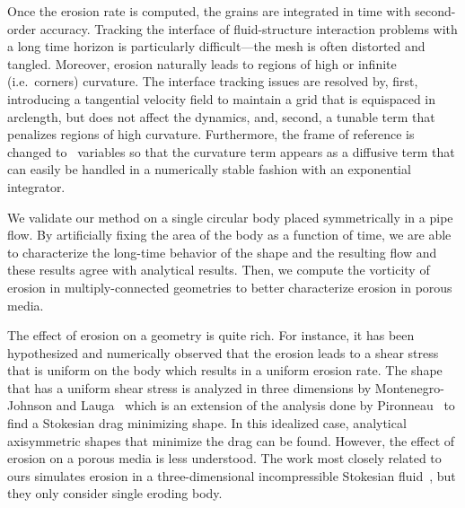 \documentclass[preprint, 10pt]{elsarticle}
\begin{document}
Once the erosion rate is computed, the grains are integrated in time with
second-order accuracy.  Tracking the interface of fluid-structure
interaction problems with a long time horizon is particularly
difficult---the mesh is often distorted and tangled.  Moreover, erosion
naturally leads to regions of high or infinite (i.e.~corners) curvature.
The interface tracking issues are resolved by, first, introducing a
tangential velocity field to maintain a grid that is equispaced in
arclength, but does not affect the dynamics, and, second, a tunable term
that penalizes regions of high curvature.  Furthermore, the frame of
reference is changed to \thL~variables so that the curvature term
appears as a diffusive term that can easily be handled in a numerically
stable fashion with an exponential integrator.

We validate our method on a single circular body placed symmetrically in
a pipe flow.  By artificially fixing the area of the body as a function
of time, we are able to characterize the long-time behavior of the shape
and the resulting flow and these results agree with analytical results.
Then, we compute the vorticity of erosion in multiply-connected
geometries to better characterize erosion in porous media. 

The effect of erosion on a geometry is quite rich.  For instance, it has
been hypothesized and numerically observed that the erosion leads to a
shear stress that is uniform on the body which results in a uniform
erosion rate.  The shape that has a uniform shear stress is analyzed in
three dimensions by Montenegro-Johnson and Lauga~\cite{mon-lau2015}
which is an extension of the analysis done by Pironneau~\cite{pir1973}
to find a Stokesian drag minimizing shape. 
In this idealized case, analytical axisymmetric shapes that minimize the
drag can be found.  However, the effect of erosion on a porous media is
less understood.  The work most closely related to ours simulates erosion in a three-dimensional incompressible Stokesian fluid~\cite{mit-spa2016}, but they only consider single eroding body. 
\end{document}
